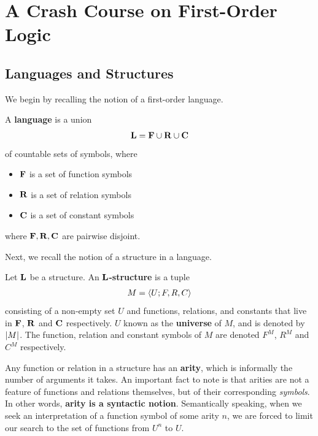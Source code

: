 \section{A Crash Course on First-Order Logic}

\subsection{Languages and Structures}

We begin by recalling the notion of a first-order language.

\begin{boxdefinition}[Language]
    A \textbf{language} is a union
    \begin{align*}
        \mathbf{L} = \mathbf{F} \cup \mathbf{R} \cup \mathbf{C}
    \end{align*}
    of countable sets of symbols, where
    \begin{itemize}
        \item $\mathbf{F}$ is a set of function symbols
        \item $\mathbf{R}$ is a set of relation symbols
        \item $\mathbf{C}$ is a set of constant symbols
    \end{itemize}
    where $\mathbf{F}, \mathbf{R}, \mathbf{C}$ are pairwise disjoint.
\end{boxdefinition}

Next, we recall the notion of a structure in a language.

\begin{boxdefinition}[Structure]
    Let $\mathbf{L}$ be a structure. An \textbf{$\mathbf{L}$-structure} is a tuple
    \begin{align*}
        M = \left\langle U; F, R, C \right\rangle
    \end{align*}
    consisting of a non-empty set $U$ and functions, relations, and constants that live in $\mathbf{F}$, $\mathbf{R}$ and $\mathbf{C}$ respectively. $U$ known as the \textbf{universe} of $M$, and is denoted by $\left\lvert M \right\rvert$. The function, relation and constant symbols of $M$ are denoted $F^M$, $R^M$ and $C^M$ respectively.
\end{boxdefinition}

Any function or relation in a structure has an \textbf{arity}, which is informally the number of arguments it takes. An important fact to note is that arities are not a feature of functions and relations themselves, but of their corresponding \textit{symbols}. In other words, \textbf{arity is a syntactic notion}. Semantically speaking, when we seek an interpretation of a function symbol of some arity $n$, we are forced to limit our search to the set of functions from $U^n$ to $U$.

